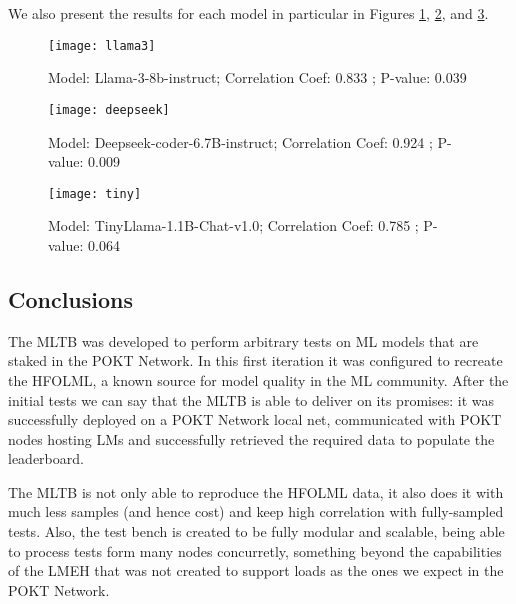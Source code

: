 We also present the results for each model in particular in Figures \ref{secb:fig:m1}, \ref{secb:fig:m2}, and \ref{secb:fig:m3}. 

\begin{figure}[htb!]
    \centering
    \texttt{[image: llama3]}
    \caption{Model: Llama-3-8b-instruct; Correlation Coef: 0.833 ; P-value: 0.039}
    \label{secb:fig:m1}
\end{figure}

\begin{figure}[htb!]
    \centering
    \texttt{[image: deepseek]}
    \caption{Model: Deepseek-coder-6.7B-instruct; Correlation Coef: 0.924 ; P-value: 0.009}
    \label{secb:fig:m2}
\end{figure}

\begin{figure}[htb!]
    \centering
    \texttt{[image: tiny]}
    \caption{Model: TinyLlama-1.1B-Chat-v1.0; Correlation Coef: 0.785 ; P-value: 0.064}
    \label{secb:fig:m3}
\end{figure}



\subsection{Conclusions}

The \gls{MLTB} was developed to perform arbitrary tests on \gls{ML} models that are staked in the POKT Network. In this first iteration it was configured to recreate the \gls{HFOLML}, a known source for model quality in the \gls{ML} community. 
After the initial tests we can say that the \gls{MLTB} is able to deliver on its promises: it was successfully deployed on a POKT Network local net, communicated with POKT nodes hosting \glspl{LM} and successfully retrieved the required data to populate the leaderboard. 

The \gls{MLTB} is not only able to reproduce the \gls{HFOLML} data, it also does it with much less samples (and hence cost) and keep high correlation with fully-sampled tests. 
Also, the test bench is created to be fully modular and scalable, being able to process tests form many nodes concurretly, something beyond the capabilities of the \gls{LMEH} that was not created to support loads as the ones we expect in the POKT Network. 